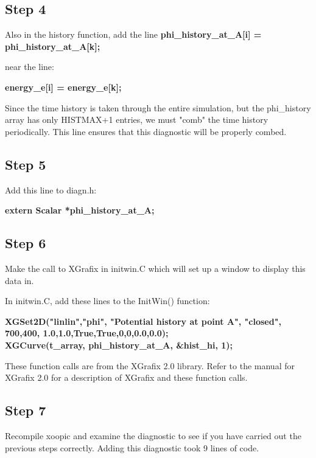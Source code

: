 \subsection{Step 4}
Also in the history function, add the line
{\bf  phi\_history\_at\_A[i] = phi\_history\_at\_A[k]; }

near the line:

{\bf  energy\_e[i] = energy\_e[k];}

  Since the time history is taken through the entire simulation, but the phi\_history
array has only HISTMAX+1 entries, we must "comb" the time history periodically.
This line ensures that this diagnostic will be properly combed.


\subsection{Step 5}

Add this line to diagn.h:

{\bf  extern Scalar *phi\_history\_at\_A;}

\subsection{Step 6}
 Make the call to XGrafix in initwin.C which will set up a window
to display this data in.

In initwin.C, add these lines to the InitWin() function:

{\bf  XGSet2D("linlin","phi", "Potential history at point A", "closed", 700,400,
	1.0,1.0,True,True,0,0,0.0,0.0);\\
  XGCurve(t\_array, phi\_history\_at\_A, \&hist\_hi, 1); }

These function calls are from the XGrafix 2.0 library.  Refer to the manual for
XGrafix 2.0 for a description of XGrafix and these function calls.

\subsection{Step 7}

  Recompile xoopic and examine the diagnostic to see if you have carried
out the previous steps correctly.  Adding this diagnostic took 9 lines of code.




